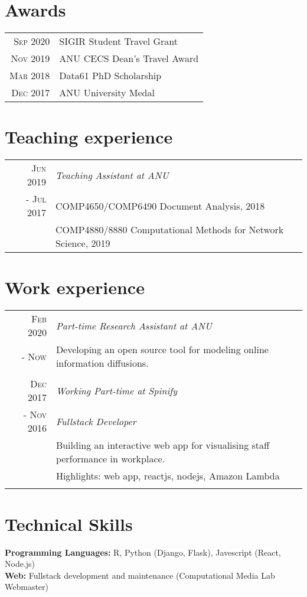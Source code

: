 \documentclass[a4paper,10pt]{article}
\begin{document}
\section{Awards}
\begin{tabular}{rl}
\textsc{Sep 2020} & SIGIR Student Travel Grant \\
\textsc{Nov 2019} & ANU CECS Dean's Travel Award \\
\textsc{Mar 2018} & Data61 PhD Scholarship \\
\textsc{Dec 2017} & ANU University Medal \\
\end{tabular}

\section{Teaching experience}
\begin{tabular}{r|p{11cm}}
  \textsc{Jun 2019} & \textit{Teaching Assistant at ANU} \\\textsc{- Jul 2017}&\footnotesize{COMP4650/COMP6490 Document Analysis, 2018}\\&\footnotesize{COMP4880/8880 Computational Methods for Network Science, 2019}
\end{tabular}

\section{Work experience}
\begin{tabular}{r|p{11cm}}
  \textsc{Feb 2020} & \textit{Part-time Research Assistant at ANU} \\\textsc{- Now}&\footnotesize{Developing an open source tool for modeling online information diffusions.}\\
  \multicolumn{2}{c}{} \\
  
 \textsc{Dec 2017} & \textit{Working Part-time at Spinify} \\\textsc{- Nov 2016}&\emph{Fullstack Developer}\\&\footnotesize{Building an interactive web app for visualising staff performance in workplace.}\\& \footnotesize{Highlights: web app, reactjs, nodejs, Amazon Lambda}\\\multicolumn{2}{c}{}\\
\end{tabular}

\section{Technical Skills}
\textbf{Programming Languages:} R, Python (Django, Flask), Javescript (React, Node.js)\\
\textbf{Web:} Fullstack development and maintenance (Computational Media Lab Webmaster)\\
\end{document}
